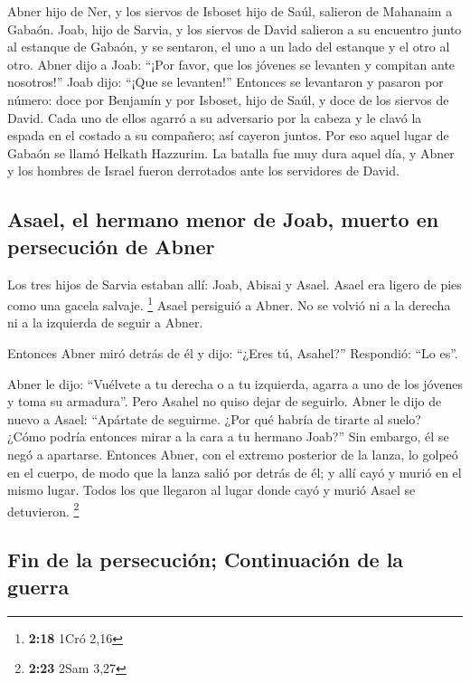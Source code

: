  Abner hijo de Ner, y los siervos de Isboset hijo de
Saúl, salieron de Mahanaim a Gabaón.  Joab, hijo de
Sarvia, y los siervos de David salieron a su encuentro junto al estanque
de Gabaón, y se sentaron, el uno a un lado del estanque y el otro al
otro.  Abner dijo a Joab: ``¡Por favor, que los jóvenes
se levanten y compitan ante nosotros!'' Joab dijo: ``¡Que se levanten!''
 Entonces se levantaron y pasaron por número: doce por
Benjamín y por Isboset, hijo de Saúl, y doce de los siervos de David.
 Cada uno de ellos agarró a su adversario por la cabeza y
le clavó la espada en el costado a su compañero; así cayeron juntos. Por
eso aquel lugar de Gabaón se llamó Helkath Hazzurim.  La
batalla fue muy dura aquel día, y Abner y los hombres de Israel fueron
derrotados ante los servidores de David.

\hypertarget{asael-el-hermano-menor-de-joab-muerto-en-persecuciuxf3n-de-abner}{%
\subsection{Asael, el hermano menor de Joab, muerto en persecución de
Abner}\label{asael-el-hermano-menor-de-joab-muerto-en-persecuciuxf3n-de-abner}}

 Los tres hijos de Sarvia estaban allí: Joab, Abisai y
Asael. Asael era ligero de pies como una gacela salvaje. \footnote{\textbf{2:18}
  1Cró 2,16}  Asael persiguió a Abner. No se volvió ni a
la derecha ni a la izquierda de seguir a Abner.

 Entonces Abner miró detrás de él y dijo: ``¿Eres tú,
Asahel?'' Respondió: ``Lo es''.

 Abner le dijo: ``Vuélvete a tu derecha o a tu izquierda,
agarra a uno de los jóvenes y toma su armadura''. Pero Asahel no quiso
dejar de seguirlo.  Abner le dijo de nuevo a Asael:
``Apártate de seguirme. ¿Por qué habría de tirarte al suelo? ¿Cómo
podría entonces mirar a la cara a tu hermano Joab?''  Sin
embargo, él se negó a apartarse. Entonces Abner, con el extremo
posterior de la lanza, lo golpeó en el cuerpo, de modo que la lanza
salió por detrás de él; y allí cayó y murió en el mismo lugar. Todos los
que llegaron al lugar donde cayó y murió Asael se detuvieron.
\footnote{\textbf{2:23} 2Sam 3,27}

\hypertarget{fin-de-la-persecuciuxf3n-continuaciuxf3n-de-la-guerra}{%
\subsection{Fin de la persecución; Continuación de la
guerra}\label{fin-de-la-persecuciuxf3n-continuaciuxf3n-de-la-guerra}}

